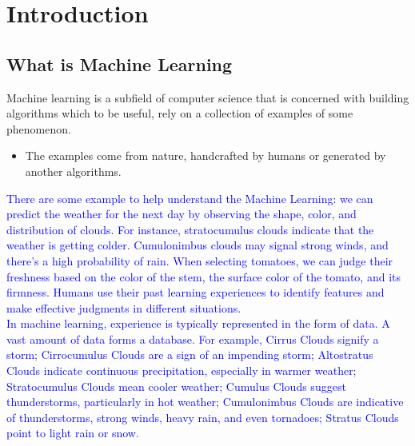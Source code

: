 \chapter{Introduction}
\section{What is Machine Learning}
Machine learning is a subfield of computer science that is concerned with building algorithms which to be useful, rely on a collection of examples of some phenomenon.
\begin{itemize}
	\item The examples come from nature, handcrafted by humans or generated by another algorithms.
\end{itemize}
\textcolor{blue}{There are some example to help understand the Machine Learning: we can predict the weather for the next day by observing the shape, color, and distribution of clouds. For instance, stratocumulus clouds indicate that the weather is getting colder. Cumulonimbus clouds may signal strong winds, and there's a high probability of rain. When selecting tomatoes, we can judge their freshness based on the color of the stem, the surface color of the tomato, and its firmness. Humans use their past learning experiences to identify features and make effective judgments in different situations.
\\In machine learning, experience is typically represented in the form of data. A vast amount of data forms a database. For example, Cirrus Clouds signify a storm; Cirrocumulus Clouds are a sign of an impending storm; Altostratus Clouds indicate continuous precipitation, especially in warmer weather; Stratocumulus Clouds mean cooler weather; Cumulus Clouds suggest thunderstorms, particularly in hot weather; Cumulonimbus Clouds are indicative of thunderstorms, strong winds, heavy rain, and even tornadoes; Stratus Clouds point to light rain or snow.}

